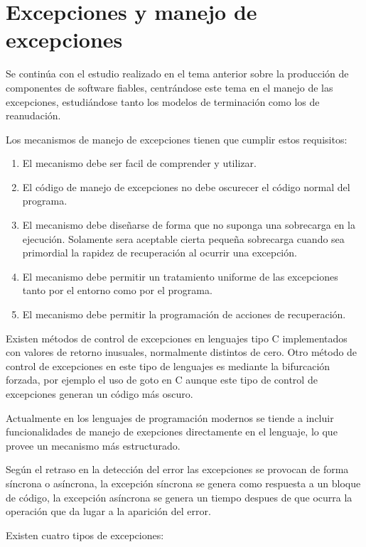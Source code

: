 \section{Excepciones y manejo de excepciones}

Se continúa con el estudio realizado en el tema anterior sobre la producción de
componentes de software fiables, centrándose este tema en el manejo de las
excepciones, estudiándose tanto los modelos de terminación como los de
reanudación.

Los mecanismos de manejo de excepciones tienen que cumplir estos requisitos:

\begin{enumerate}
	\item El mecanismo debe ser facil de comprender y utilizar.
	\item El código de manejo de excepciones no debe oscurecer el código
normal del programa.
	\item El mecanismo debe diseñarse de forma que no suponga una sobrecarga
en la ejecución. Solamente sera aceptable cierta pequeña sobrecarga cuando sea
primordial la rapidez de recuperación al ocurrir una excepción.
	\item El mecanismo debe permitir un tratamiento uniforme de las
excepciones tanto por el entorno como por el programa.
	\item El mecanismo debe permitir la programación de acciones de
recuperación.
\end{enumerate}

Existen métodos de control de excepciones en lenguajes tipo C implementados con
valores de retorno inusuales, normalmente distintos de cero. Otro método de
control de excepciones en este tipo de lenguajes es mediante la bifurcación
forzada, por ejemplo el uso de goto en C aunque este tipo de control de
excepciones generan un código más oscuro.

Actualmente en los lenguajes de programación modernos se tiende a incluir
funcionalidades de manejo de exepciones directamente en el lenguaje, lo que
provee un mecanismo más estructurado.

Según el retraso en la detección del error las excepciones se provocan de forma
síncrona o asíncrona, la excepción síncrona se genera como respuesta a un bloque
de código, la excepción asíncrona se genera un tiempo despues de que ocurra la
operación que da lugar a la aparición del error.

Existen cuatro tipos de excepciones:

